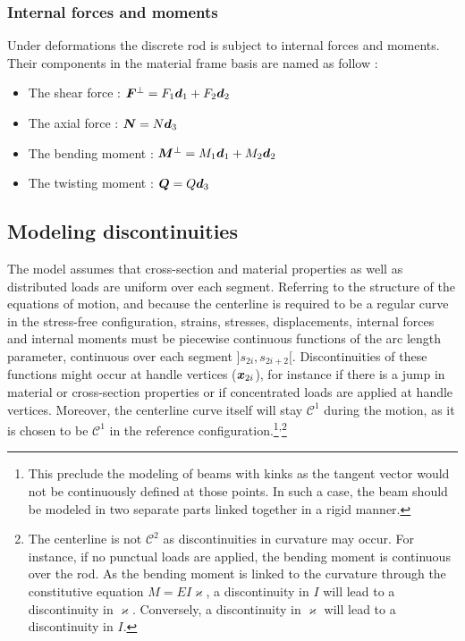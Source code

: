  \subsubsection{Internal forces and moments}
Under deformations the discrete rod is subject to internal forces and moments. Their components in the material frame basis are named as follow :
\begin{itemize}
\item The shear force : $\boldsymbol{F}^{\perp} = F_1 \boldsymbol{d}_1 + F_2 \boldsymbol{d}_2$ 
\item The axial force : $\boldsymbol{N} = N \boldsymbol{d}_3$
\item The bending moment : $\boldsymbol{M}^{\perp} = M_1 \boldsymbol{d}_1 + M_2 \boldsymbol{d}_2$ 
\item The twisting moment : $\boldsymbol{Q} = Q \boldsymbol{d}_3$ 
\end{itemize}

 \subsection{Modeling discontinuities}
The model assumes that cross-section and material properties as well as distributed loads are uniform over each segment. Referring to the structure of the equations of motion, and because the centerline is required to be a regular curve in the stress-free configuration, strains, stresses, displacements, internal forces and internal moments must be piecewise continuous functions of the arc length parameter, continuous over each segment $]s_{2i},s_{2i+2}[$. Discontinuities of these functions might occur at handle vertices ($\boldsymbol{x}_{2i}$), for instance if there is a jump in material or cross-section properties or if concentrated loads are applied at handle vertices. Moreover, the centerline curve itself will stay $\mathcal{C}^1$ during the motion, as it is chosen to be $\mathcal{C}^1$ in the reference configuration.\footnote{This preclude the modeling of beams with kinks as the tangent vector would not be continuously defined at those points. In such a case, the beam should be modeled in two separate parts linked together in a rigid manner.}\textsuperscript{,}\footnote{The centerline is not $\mathcal{C}^2$ as discontinuities in curvature may occur. For instance, if no punctual loads are applied, the bending moment is continuous over the rod. As the bending moment is linked to the curvature through the constitutive equation $M = EI\varkappa$, a discontinuity in $I$ will lead to a discontinuity in $\varkappa$. Conversely, a discontinuity in $\varkappa$ will lead to a discontinuity in $I$.}

